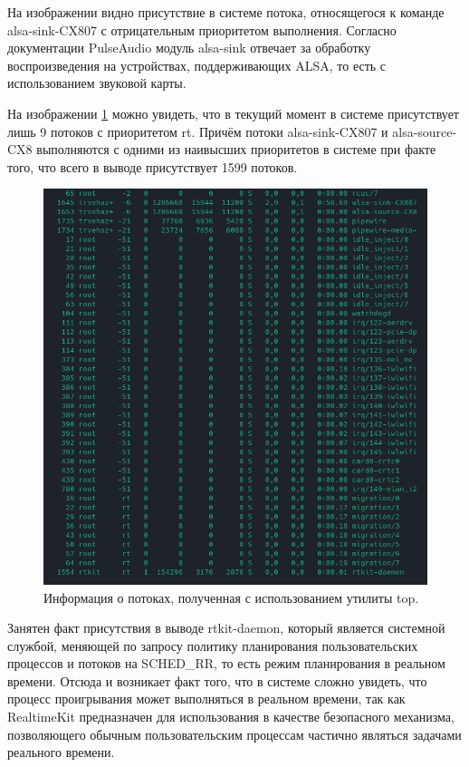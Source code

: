 На изображении видно присутствие в системе потока, относящегося к команде alsa-sink-CX807 с отрицательным приоритетом выполнения. Согласно документации PulseAudio \cite{pulseAudioDocumentation} модуль alsa-sink отвечает за обработку воспроизведения на устройствах, поддерживающих ALSA, то есть с использованием звуковой карты.

На изображении \ref{fig:rtThreads} можно увидеть, что в текущий момент в системе присутствует лишь 9 потоков с приоритетом rt. Причём потоки alsa-sink-CX807 и alsa-source-CX8 выполняются с одними из наивысших приоритетов в системе при факте того, что всего в выводе присутствует 1599 потоков.

\begin{figure}[H]
	\centering
	\includegraphics[scale=0.7]{img/rtThreads.png}
	\caption{Информация о потоках, полученная с использованием утилиты top. }
	\label{fig:rtThreads}
\end{figure}

Занятен факт присутствия в выводе rtkit-daemon, который является системной службой, меняющей по запросу политику планирования пользовательских процессов и потоков на SCHED\_RR, то есть режим планирования в реальном времени. Отсюда и возникает факт того, что в системе сложно увидеть, что процесс проигрывания может выполняться в реальном времени, так как RealtimeKit предназначен для использования в качестве безопасного механизма, позволяющего обычным пользовательским процессам частично являться задачами реального времени.

